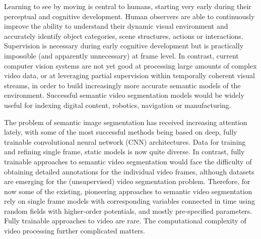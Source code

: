 \documentclass[10pt,twocolumn,letterpaper]{article}
\begin{document}
Learning to see by moving is central to humans, starting very early during their perceptual and cognitive development\cite{gelman96}. Human observers are able to continuously improve the ability to understand their dynamic visual environment and accurately identify object categories, scene structures, actions or interactions. Supervision is necessary during early cognitive development but is practically impossible (and apparently unnecessary) at frame level. In contrast, current computer vision systems are not yet good at processing large amounts of complex video data, or at leveraging partial supervision within temporally coherent visual streams, in order to build increasingly more accurate semantic models of the environment. Successful semantic video segmentation models would be widely useful for indexing digital content, robotics, navigation or manufacturing. 

The problem of semantic image segmentation has received increasing attention lately, with some of the most successful methods being based on deep, fully trainable convolutional neural network (CNN) architectures. 
Data for training and refining single frame, static models is now quite diverse\cite{everingham2015pascal,lin2014microsoft}.
In contrast, fully trainable approaches to semantic video segmentation would face the difficulty of obtaining detailed annotations for the individual video frames, although datasets are emerging for the (unsupervised) video segmentation problem\cite{NB13}. Therefore, for now some of the existing, pioneering approaches to semantic video segmentation\cite{rehg2012,XuXiCoECCV2012,kundu2016feature} rely on single frame models with corresponding variables connected in time using random fields with higher-order potentials, and mostly pre-specified parameters. Fully trainable approaches to video are rare. The computational complexity of video processing further complicated matters. 
\end{document}
